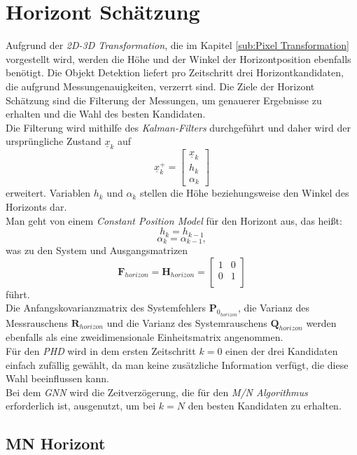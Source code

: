 \documentclass[10pt,a4paper]{article}
\begin{document}
\section{Horizont Schätzung}
Aufgrund der \textit{2D-3D Transformation}, die im Kapitel \ref{sub:Pixel Transformation} vorgestellt wird, werden die Höhe und der Winkel der Horizontposition ebenfalls benötigt. Die Objekt Detektion liefert pro Zeitschritt drei Horizontkandidaten, die aufgrund Messungenauigkeiten, verzerrt sind. Die Ziele der Horizont Schätzung sind die Filterung der Messungen, um genauerer Ergebnisse zu erhalten und die Wahl des besten Kandidaten.\\
Die Filterung wird mithilfe des \textit{Kalman-Filters} durchgeführt und daher wird der ursprüngliche Zustand $\underline{x}_{k}$ auf 
\begin{equation}
\underline{x}^+_{k} = \begin{bmatrix}
\underline{x}_{k} \\
h_{k}\\
\alpha_{k}
\end{bmatrix}
\end{equation}
erweitert. Variablen $h_{k}$ und $\alpha_{k}$ stellen die Höhe beziehungsweise den Winkel des Horizonts dar.\\
Man geht von einem \textit{Constant Position Model} für den Horizont aus, das heißt:\\
\begin{equation}
h_k = h_{k-1}
\end{equation}
\begin{equation*}
\alpha_k = \alpha_{k-1},
\end{equation*}
was zu den System und Ausgangsmatrizen
\begin{equation}
\textbf{F}_{horizon} = \textbf{H}_{horizon} = \begin{bmatrix}
1 & 0  \\
0 & 1\\
\end{bmatrix}
\end{equation}
führt.\\
Die Anfangskovarianzmatrix des Systemfehlers $\textbf{P}_{0_{horizon}}$, die Varianz des Messrauschens $\textbf{R}_{horizon}$ und die Varianz des Systemrauschens $\textbf{Q}_{horizon}$ werden ebenfalls als eine zweidimensionale Einheitsmatrix angenommen.\\
Für den \textit{PHD} wird in dem ersten Zeitschritt $k = 0$ einen der drei Kandidaten einfach zufällig gewählt, da man keine zusätzliche Information verfügt, die diese Wahl beeinflussen kann.\\
Bei dem \textit{GNN} wird die Zeitverzögerung, die für den \textit{M/N Algorithmus} erforderlich ist, ausgenutzt, um bei $k = N$ den besten Kandidaten zu erhalten.
\subsection{MN Horizont}
\end{document}
